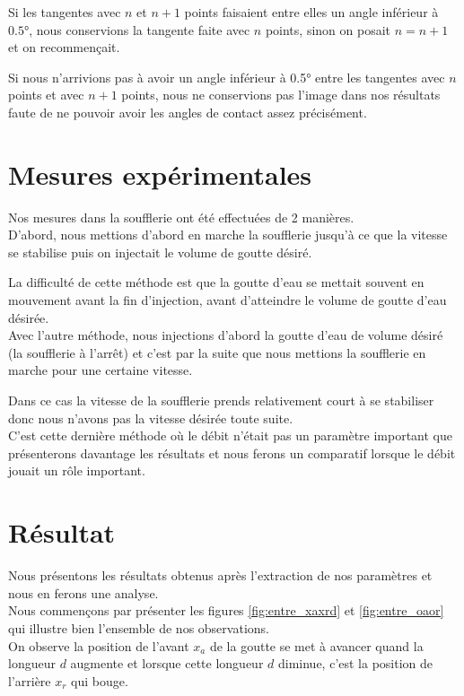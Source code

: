 \documentclass[french]{article}
\begin{document}
Si les tangentes avec $n$ et $n+1$ points faisaient entre elles un angle inférieur à $\ang{0.5}$, nous conservions la tangente faite avec $n$ points, sinon on posait $n = n+1$ et on recommençait.

Si nous n'arrivions pas à avoir un angle inférieur à \ang{0.5}  entre les tangentes avec $n$ points et avec $n+1$ points, nous ne conservions pas l'image dans nos résultats faute de ne pouvoir avoir les angles de contact assez précisément.

\section{Mesures expérimentales}

Nos mesures dans la soufflerie ont été effectuées de 2 manières.\\

D'abord, nous mettions d'abord en marche la soufflerie jusqu'à ce que la vitesse se stabilise puis on injectait le volume de goutte désiré.

La difficulté de cette méthode est que la goutte d'eau se mettait souvent en mouvement avant la fin d'injection, avant d'atteindre le volume de goutte d'eau désirée.\\

Avec l'autre méthode, nous injections d'abord la goutte d'eau de volume désiré (la soufflerie à l'arrêt) et c'est par la suite que nous mettions la soufflerie en marche pour une certaine vitesse.

Dans ce cas la vitesse de la soufflerie prends relativement court à se stabiliser donc nous n'avons pas la vitesse désirée toute suite.\\

C'est cette dernière méthode où le débit n'était pas un paramètre important que présenterons davantage les résultats et nous ferons un comparatif lorsque le débit jouait un rôle important.
\newpage
\section{Résultat}

Nous présentons les résultats obtenus après l'extraction de nos paramètres et nous en ferons une analyse.\\
Nous commençons par présenter les figures \ref{fig:entre_xaxrd} et \ref{fig:entre_oaor} qui illustre bien l'ensemble de nos observations.\\

On observe la position de l'avant $x_{a}$ de la goutte se met à avancer quand la longueur $d$ augmente et lorsque cette longueur $d$ diminue, c'est la position de l'arrière $x_{r}$ qui bouge.
\end{document}
